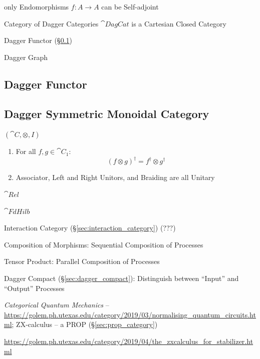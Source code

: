 only Endomorphisms $f : A \rightarrow A$ can be Self-adjoint

Category of Dagger Categories $\cat{DagCat}$ is a Cartesian Closed Category

Dagger Functor (\S\ref{sec:dagger_functor})

Dagger Graph %



\subsection{Dagger Functor}\label{sec:dagger_functor}

\subsection{Dagger Symmetric Monoidal Category}
\label{sec:dagger_symmetric_monoidal}

$(\cat{C}, \otimes, I)$

\begin{enumerate}
  \item For all $f,g \in \cat{C}_1$:
    \[
      (f \otimes g)^\dag = f^\dag \otimes g^\dag
    \]
  \item Associator, Left and Right Unitors, and Braiding are all Unitary
\end{enumerate}

$\cat{Rel}$

$\cat{FdHilb}$

Interaction Category (\S\ref{sec:interaction_category}) (???)

Composition of Morphisms: Sequential Composition of Processes

Tensor Product: Parallel Composition of Processes

Dagger Compact (\S\ref{sec:dagger_compact}): Distinguish between
``Input'' and ``Output'' Processes

\emph{Categorical Quantum Mechanics} --
\url{https://golem.ph.utexas.edu/category/2019/03/normalising_quantum_circuits.html};
ZX-calculus -- a PROP (\S\ref{sec:prop_category})

\url{https://golem.ph.utexas.edu/category/2019/04/the_zxcalculus_for_stabilizer.html}



